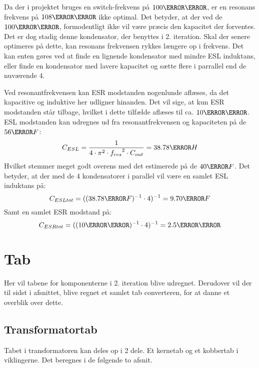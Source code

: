 Da der i projektet bruges en switch-frekvens på $100\kilo \hertz$, er en resonans frekvens på $108\kilo \hertz$ ikke optimal. Det betyder, at der ved de $100\kilo \hertz$, formodentligt ikke vil være præcis den kapacitet der forventes. Det er dog stadig denne kondensator, der benyttes i 2. iteration. Skal der senere optimeres på dette, kan resonans frekvensen rykkes længere op i frekvens. Det kan enten gøres ved at finde en lignende kondensator med mindre ESL induktans, eller finde en kondensator med lavere kapacitet og sætte flere i parrallel end de nuværende 4.


\noindent Ved resonantfrekvensen kan ESR modstanden nogenlunde aflæses, da det kapacitive og induktive her udligner hinanden. Det vil sige, at kun ESR modstanden står tilbage, hvilket i dette tilfælde aflæses til ca. $10\milli \ohm$. 
ESL modstanden kan udregnes ud fra resonantfrekvensen og kapaciteten på de $56\micro F$:
\begin{equation} \label{CESL}
C_{ESL} = \frac{1}{4 \cdot \pi^{2} \cdot {f_{res}}^{2} \cdot C_{out}} = 38.78\nano H
\end{equation}
Hvilket stemmer meget godt overens med det estimerede på de $40\nano F$.
Det betyder, at der med de 4 kondensatorer i parallel vil være en samlet ESL induktans på: 
\begin{equation} \label{CESLtot}
C_{ESLtot} = ((38.78\nano F)^{-1} \cdot 4)^{-1} = 9.70\nano F
\end{equation}
Samt en samlet ESR modstand på:
\begin{equation} \label{CSRtot}
C_{ESRtot} = ((10\milli \ohm)^{-1} \cdot 4)^{-1} = 2.5\milli \ohm
\end{equation}



\section{Tab}
Her vil tabene for komponenterne i 2. iteration blive udregnet.  Derudover vil der til sidst i afsnittet, blive regnet et samlet tab converteren, for at danne et overblik over dette. 

\subsection{Transformatortab}
Tabet i transformatoren kan deles op i 2 dele. Et kernetab og et kobbertab i viklingerne. Det beregnes i de følgende to afsnit.

